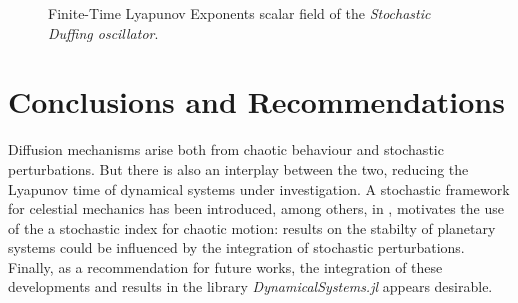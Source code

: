 \documentclass{juliacon}
\begin{document}
\begin{figure}[h]
    \centering
    \caption{Finite-Time Lyapunov Exponents scalar field of the \emph{Stochastic Duffing oscillator}.}
    \label{fig:duff}
\end{figure}

\section{Conclusions and Recommendations}
Diffusion mechanisms arise both from chaotic behaviour and stochastic perturbations. 
But there is also an interplay between the two, reducing the Lyapunov time of dynamical systems under investigation.
A stochastic framework for celestial mechanics has been introduced, among others, in \cite{manzibosch}, motivates the use of the a 
stochastic index for chaotic motion: results on the stabilty of planetary systems could be influenced by the integration of stochastic 
perturbations.
Finally, as a recommendation for future works, the integration of these developments and results in the library \textit{DynamicalSystems.jl} appears desirable.


\end{document}
